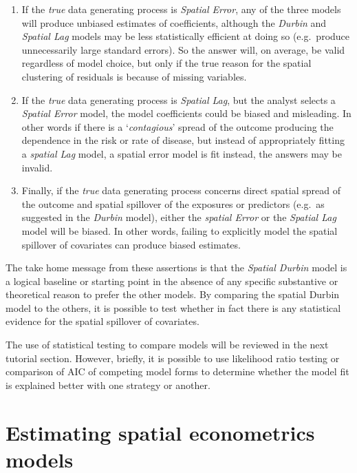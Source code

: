 \documentclass[
]{book}
\providecommand{\tightlist}{%
  \setlength{\itemsep}{0pt}\setlength{\parskip}{0pt}}
\begin{document}
\begin{enumerate}
\def\labelenumi{\arabic{enumi}.}
\tightlist
\item
  If the \emph{true} data generating process is \emph{Spatial Error}, any of the three models will produce unbiased estimates of coefficients, although the \emph{Durbin} and \emph{Spatial Lag} models may be less statistically efficient at doing so (e.g.~produce unnecessarily large standard errors). So the answer will, on average, be valid regardless of model choice, but only if the true reason for the spatial clustering of residuals is because of missing variables.
\item
  If the \emph{true} data generating process is \emph{Spatial Lag}, but the analyst selects a \emph{Spatial Error} model, the model coefficients could be biased and misleading. In other words if there is a `\emph{contagious}' spread of the outcome producing the dependence in the risk or rate of disease, but instead of appropriately fitting a \emph{spatial Lag} model, a spatial error model is fit instead, the answers may be invalid.
\item
  Finally, if the \emph{true} data generating process concerns direct spatial spread of the outcome and spatial spillover of the exposures or predictors (e.g.~as suggested in the \emph{Durbin} model), either the \emph{spatial Error} or the \emph{Spatial Lag} model will be biased. In other words, failing to explicitly model the spatial spillover of covariates can produce biased estimates.
\end{enumerate}

The take home message from these assertions is that the \emph{Spatial Durbin} model is a logical baseline or starting point in the absence of any specific substantive or theoretical reason to prefer the other models. By comparing the spatial Durbin model to the others, it is possible to test whether in fact there is any statistical evidence for the spatial spillover of covariates.

The use of statistical testing to compare models will be reviewed in the next tutorial section. However, briefly, it is possible to use likelihood ratio testing or comparison of AIC of competing model forms to determine whether the model fit is explained better with one strategy or another.

\hypertarget{estimating-spatial-econometrics-models}{%
\section{Estimating spatial econometrics models}\label{estimating-spatial-econometrics-models}}
\end{document}
